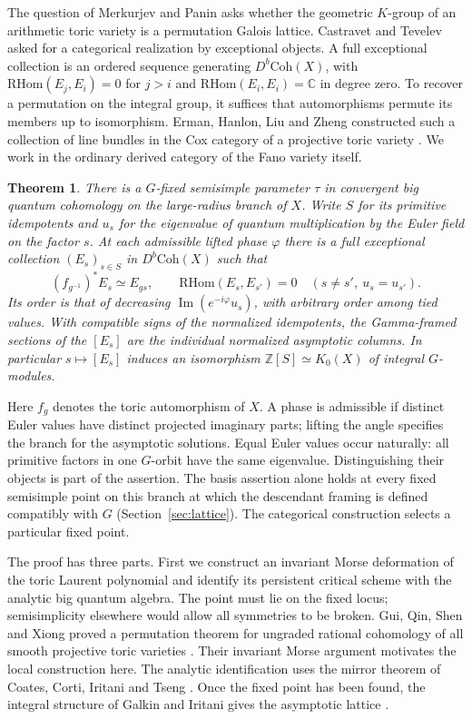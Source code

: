 \documentclass[11pt]{amsart}
\newtheorem{theorem}{Theorem}[section]
\theoremstyle{definition}
\newcommand{\C}{\mathbb C}
\newcommand{\Z}{\mathbb Z}
\begin{document}
The question of Merkurjev and Panin asks whether the geometric $K$-group of an arithmetic toric variety is a permutation Galois lattice. Castravet and Tevelev asked for a categorical realization by exceptional objects. A full exceptional collection is an ordered sequence generating $D^b\mathrm{Coh}(X)$, with $\mathrm{RHom}(E_j,E_i)=0$ for $j>i$ and $\mathrm{RHom}(E_i,E_i)=\C$ in degree zero. To recover a permutation on the integral group, it suffices that automorphisms permute its members up to isomorphism. Erman, Hanlon, Liu and Zheng constructed such a collection of line bundles in the Cox category of a projective toric variety \cite{EHLZ}. We work in the ordinary derived category of the Fano variety itself.

\begin{theorem}\label{thm:maincombined}
There is a $G$-fixed semisimple parameter $\tau$ in convergent big quantum cohomology on the large-radius branch of $X$. Write $S$ for its primitive idempotents and $u_s$ for the eigenvalue of quantum multiplication by the Euler field on the factor $s$. At each admissible lifted phase $\varphi$ there is a full exceptional collection $(E_s)_{s\in S}$ in $D^b\mathrm{Coh}(X)$ such that
\[
      (f_{g^{-1}})^*E_s\simeq E_{gs},\qquad
      \mathrm{RHom}(E_s,E_{s'})=0\quad(s\ne s',\ u_s=u_{s'}).
\]
Its order is that of decreasing $\operatorname{Im}(e^{-i\varphi}u_s)$, with arbitrary order among tied values. With compatible signs of the normalized idempotents, the Gamma-framed sections of the $[E_s]$ are the individual normalized asymptotic columns. In particular $s\mapsto[E_s]$ induces an isomorphism $\Z[S]\simeq K_0(X)$ of integral $G$-modules.
\end{theorem}

Here $f_g$ denotes the toric automorphism of $X$. A phase is admissible if distinct Euler values have distinct projected imaginary parts; lifting the angle specifies the branch for the asymptotic solutions. Equal Euler values occur naturally: all primitive factors in one $G$-orbit have the same eigenvalue. Distinguishing their objects is part of the assertion. The basis assertion alone holds at every fixed semisimple point on this branch at which the descendant framing is defined compatibly with $G$ (Section~\ref{sec:lattice}). The categorical construction selects a particular fixed point.

The proof has three parts. First we construct an invariant Morse deformation of the toric Laurent polynomial and identify its persistent critical scheme with the analytic big quantum algebra. The point must lie on the fixed locus; semisimplicity elsewhere would allow all symmetries to be broken. Gui, Qin, Shen and Xiong proved a permutation theorem for ungraded rational cohomology of all smooth projective toric varieties \cite[Theorem~1.2]{GQSX}. Their invariant Morse argument motivates the local construction here. The analytic identification uses the mirror theorem of Coates, Corti, Iritani and Tseng \cite{CCIT}. Once the fixed point has been found, the integral structure of Galkin and Iritani gives the asymptotic lattice \cite{GI}.
\end{document}
